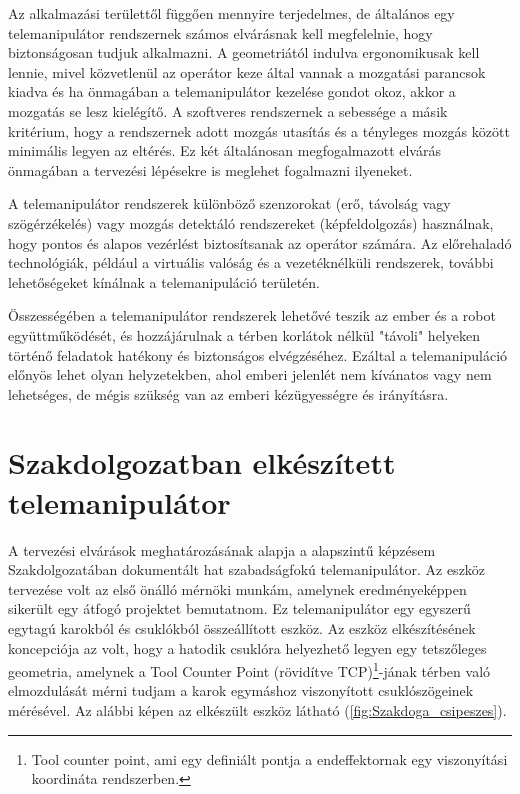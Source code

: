 Az alkalmazási területtől függően mennyire terjedelmes, de általános egy telemanipulátor rendszernek számos elvárásnak kell megfelelnie, hogy biztonságosan tudjuk alkalmazni. A geometriától indulva ergonomikusak kell lennie, mivel közvetlenül az operátor keze által vannak a mozgatási parancsok kiadva és ha önmagában a telemanipulátor kezelése gondot okoz, akkor a mozgatás se lesz kielégítő. A szoftveres rendszernek a sebessége a másik kritérium, hogy a rendszernek adott mozgás utasítás és a tényleges mozgás között minimális legyen az eltérés. Ez két általánosan megfogalmazott elvárás önmagában a tervezési lépésekre is meglehet fogalmazni ilyeneket.

A telemanipulátor rendszerek különböző szenzorokat (erő, távolság vagy szögérzékelés) vagy mozgás detektáló rendszereket (képfeldolgozás) használnak, hogy pontos és alapos vezérlést biztosítsanak az operátor számára. Az előrehaladó technológiák, például a virtuális valóság és a vezetéknélküli rendszerek, további lehetőségeket kínálnak a telemanipuláció területén.

Összességében a telemanipulátor rendszerek lehetővé teszik az ember és a robot együttműködését, és hozzájárulnak a térben korlátok nélkül "távoli" helyeken történő feladatok hatékony és biztonságos elvégzéséhez. Ezáltal a telemanipuláció előnyös lehet olyan helyzetekben, ahol emberi jelenlét nem kívánatos vagy nem lehetséges, de mégis szükség van az emberi kézügyességre és irányításra.

\section{Szakdolgozatban elkészített telemanipulátor}

A tervezési elvárások meghatározásának alapja a alapszintű képzésem Szakdolgozatában dokumentált hat szabadságfokú telemanipulátor. Az eszköz tervezése volt az első önálló mérnöki munkám, amelynek eredményeképpen sikerült egy átfogó projektet bemutatnom. Ez telemanipulátor egy egyszerű egytagú karokból és csuklókból összeállított eszköz. Az eszköz elkészítésének koncepciója az volt, hogy a hatodik csuklóra helyezhető legyen egy tetszőleges geometria, amelynek a Tool Counter Point (rövidítve TCP)\footnote{Tool counter point, ami egy definiált pontja a endeffektornak egy viszonyítási koordináta rendszerben.}-jának térben való elmozdulását mérni tudjam a karok egymáshoz viszonyított csuklószögeinek mérésével. Az alábbi képen az elkészült eszköz látható (\ref{fig:Szakdoga_csipeszes}).

